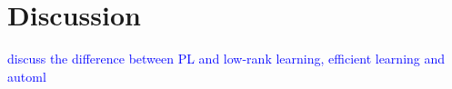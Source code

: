 \section{Discussion}
\textcolor{blue}{discuss the difference between PL and low-rank learning, efficient learning and automl}